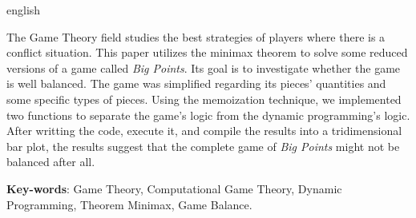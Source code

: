 \begin{resumo}[Abstract]
 \begin{otherlanguage*}{english}
	
The Game Theory field studies the best strategies of players where there is a conflict situation.
This paper utilizes the minimax theorem to solve some reduced versions of a game called \emph{Big Points}.
Its goal is to investigate whether the game is well balanced.
The game was simplified regarding its pieces' quantities and some specific types of pieces.
Using the memoization technique, we implemented two functions to separate the game's logic from the dynamic programming's logic.
After writting the code, execute it, and compile the results into a tridimensional bar plot, the results suggest that the complete game of \emph{Big Points} might not be balanced after all.


   \vspace{\onelineskip}

   \noindent
   \textbf{Key-words}: Game Theory, Computational Game Theory, Dynamic Programming, Theorem Minimax, Game Balance.
 \end{otherlanguage*}
\end{resumo}
